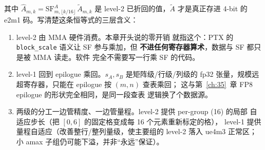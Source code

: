 其中 $\hat{A}_{m,k} = \mathrm{SF}^A_{m,\lfloor k/16\rfloor}\,\tilde{A}_{m,k}$
是 level-2 已折回的值，$\tilde{A}$ 才是真正存进 4-bit 的 e2m1
码。写清楚这条恒等式的三层含义：

\begin{enumerate}[itemsep=2pt,topsep=3pt]
  \item level-2 由 MMA 硬件消费。本章开头说的零开销
        就指这个：PTX 的 \texttt{block\_scale} 语义让 SF 参与乘加，但
        \textbf{不进任何寄存器算术}，数据与 SF 都只是被 MMA 读走。软件
        完全不需要写一行乘 SF 的代码。
  \item level-1 回到 epilogue 乘回。$s_A,s_B$ 是矩阵级/行级/列级的
        fp32 张量，规模远超寄存器，只能在 epilogue 按 $(m,n)$ 查表乘回；
        这与第~\ref{ch:35}~章 FP8 epilogue 的形状完全相同，是同一段查表
        逻辑换了个数据源。
  \item 两级的分工一边管精度、一边管量程。level-2 提供 per-group (16) 的局部
        自适应步长（把 $[0,6]$ 的固定格变成每 16 个元素重新标定的格），
        level-1 提供量程自适应（改善整行/整列量级，使主要组的 level-2 落入 ue4m3 正常区；
        小 amax 子组仍可能下溢，并非“永远”保证）。
\end{enumerate}


